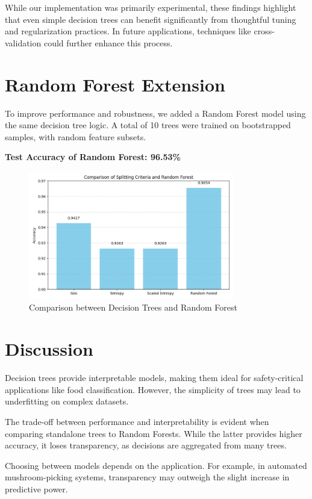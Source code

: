 \documentclass[11pt]{article}
\begin{document}
While our implementation was primarily experimental, these findings highlight that even simple decision trees can benefit significantly from thoughtful tuning and regularization practices. In future applications, techniques like cross-validation could further enhance this process.


\section{Random Forest Extension}
To improve performance and robustness, we added a Random Forest model using the same decision tree logic. A total of 10 trees were trained on bootstrapped samples, with random feature subsets.

\textbf{Test Accuracy of Random Forest: 96.53\%}

\begin{figure}[H]
    \centering
    \includegraphics[width=0.8\textwidth]{comparison_all_methods.png}
    \caption{Comparison between Decision Trees and Random Forest}
\end{figure}

\section{Discussion}
Decision trees provide interpretable models, making them ideal for safety-critical applications like food classification. However, the simplicity of trees may lead to underfitting on complex datasets.

The trade-off between performance and interpretability is evident when comparing standalone trees to Random Forests. While the latter provides higher accuracy, it loses transparency, as decisions are aggregated from many trees.

Choosing between models depends on the application. For example, in automated mushroom-picking systems, transparency may outweigh the slight increase in predictive power.
\end{document}
